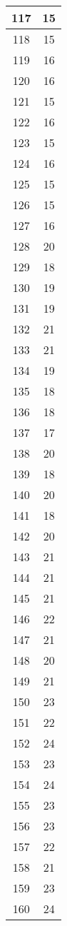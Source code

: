 \documentclass[letterpaper, 12pt]{article}
\begin{document}
\begin{longtable}{|c|c|}
\hline
117 & 15 \\
\hline
118 & 15 \\
\hline
119 & 16 \\
\hline
120 & 16 \\
\hline
121 & 15 \\
\hline
122 & 16 \\
\hline
123 & 15 \\
\hline
124 & 16 \\
\hline
125 & 15 \\
\hline
126 & 15 \\
\hline
127 & 16 \\
\hline
128 & 20 \\
\hline
129 & 18 \\
\hline
130 & 19 \\
\hline
131 & 19 \\
\hline
132 & 21 \\
\hline
133 & 21 \\
\hline
134 & 19 \\
\hline
135 & 18 \\
\hline
136 & 18 \\
\hline
137 & 17 \\
\hline
138 & 20 \\
\hline
139 & 18 \\
\hline
140 & 20 \\
\hline
141 & 18 \\
\hline
142 & 20 \\
\hline
143 & 21 \\
\hline
144 & 21 \\
\hline
145 & 21 \\
\hline
146 & 22 \\
\hline
147 & 21 \\
\hline
148 & 20 \\
\hline
149 & 21 \\
\hline
150 & 23 \\
\hline
151 & 22 \\
\hline
152 & 24 \\
\hline
153 & 23 \\
\hline
154 & 24 \\
\hline
155 & 23 \\
\hline
156 & 23 \\
\hline
157 & 22 \\
\hline
158 & 21 \\
\hline
159 & 23 \\
\hline
160 & 24 \\
\hline

\end{longtable}
\end{document}
